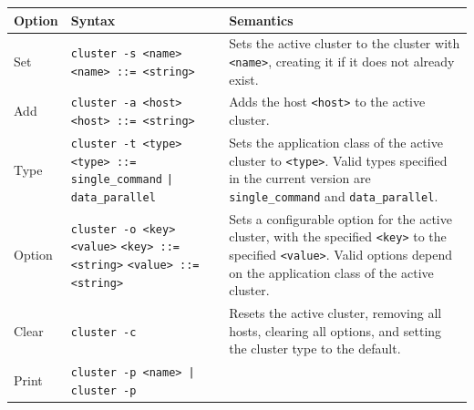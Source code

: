 \documentclass[oneside]{report}
\begin{document}
\begin{table}[h]
  \begin{center}
    \begin{tabularx}{\textwidth}{|l|X|X|}
      \hline
      Option                        & Syntax                                                                                                                                                                                       & Semantics                                                                                                         \\ \hline
      Set                           & \texttt{cluster -s <name>} \newline
      \texttt{<name> ::= <string>}  & Sets the active cluster to the cluster with \texttt{<name>}, creating it if it does not already exist.
      \\ \hline
      Add                           & \texttt{cluster -a <host>} \newline
      \texttt{<host> ::= <string>}  & Adds the host \texttt{<host>} to the active cluster.
      \\ \hline
      Type                          & \texttt{cluster -t <type>} \newline
      \texttt{<type> ::= single\_command} \newline
      \texttt{| data\_parallel}     & Sets the application class of the active cluster to \texttt{<type>}. Valid types specified in the current version are \texttt{single\_command} and \texttt{data\_parallel}.
      \\ \hline
      Option                        & \texttt{cluster -o <key> <value>} \newline
      \texttt{<key> ::= <string>} \newline
      \texttt{<value> ::= <string>} & Sets a configurable option for the active cluster, with the specified \texttt{<key>} to the specified \texttt{<value>}. Valid options depend on the application class of the active cluster.
      \\ \hline
      Clear                         & \texttt{cluster -c}                                                                                                                                                                          & Resets the active cluster, removing all hosts, clearing all options, and setting the cluster type to the default.
      \\ \hline
      Print                         & \texttt{cluster -p <name> | cluster -p} \newline

\end{tabularx}
\end{center}
\end{table}
\end{document}

